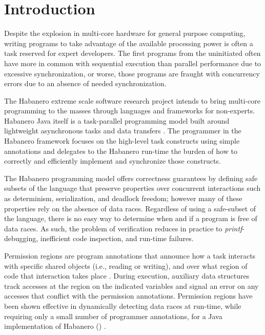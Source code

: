 \section{Introduction}
Despite the explosion in multi-core hardware for general purpose
computing, writing programs to take advantage of the available
processing power is often a task reserved for expert
developers. The first programs from the uninitiated often have
more in common with sequential execution than parallel performance due
to excessive synchronization, or worse, those programs are
fraught with concurrency errors due to an absence of needed
synchronization.

The Habanero extreme scale software research project intends to bring
multi-core programming to the masses through languages and frameworks
for non-experts. Habanero Java itself is a task-parallel programming model
built around lightweight asynchronous tasks and data transfers \cite{Cave:2011:HNA:2093157.2093165}. The
programmer in the Habanero framework focuses on the high-level task
constructs using simple annotations and
delegates to the Habanero run-time the burden of how to correctly and
efficiently implement and synchronize those constructs.

The Habanero programming model offers correctness guarantees by defining safe subsets of the
language that preserve properties over concurrent interactions such as
determinism, serialization, and deadlock freedom; however many of
these properties rely on the absence of data races. Regardless of
using a safe-subset of the language, there is no easy way to determine
when and if a program is free of data races. As such, the problem of verification
reduces in practice to \emph{printf}-debugging, inefficient code inspection, and
run-time failures.

Permission regions are program annotations that announce how a task
interacts with specific shared objects (i.e., reading or writing), and over what
region of code that interaction takes place \cite{Westbrook:2011:PRR:2341616.2341627}. During execution,
auxiliary data structures track accesses at the region on the indicated
variables and signal an error on any accesses that conflict with the permission annotations. Permission
regions have been shown effective in dynamically detecting data races
at run-time, while requiring only a small number of programmer annotations, for a Java implementation of Habanero (\hj)
\cite{Westbrook:2011:PRR:2341616.2341627,
  Westbrook:2012:PPR:2367163.2367201}.

